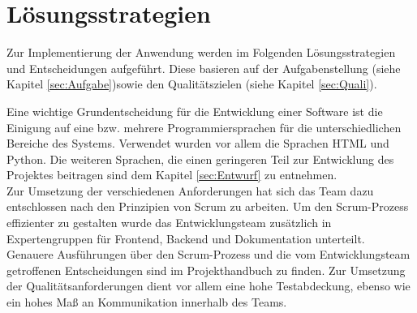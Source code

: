 \chapter{Lösungsstrategien}
Zur Implementierung der Anwendung werden im Folgenden Lösungsstrategien und Entscheidungen aufgeführt. Diese basieren auf der Aufgabenstellung (siehe Kapitel \ref{sec:Aufgabe})sowie den Qualitätszielen (siehe Kapitel \ref{sec:Quali}).

Eine wichtige Grundentscheidung für die Entwicklung einer Software ist die Einigung auf eine bzw. mehrere Programmiersprachen für die unterschiedlichen Bereiche des Systems. Verwendet wurden vor allem die Sprachen HTML und Python. Die weiteren Sprachen, die einen geringeren Teil zur Entwicklung des Projektes beitragen sind dem Kapitel \ref{sec:Entwurf} zu entnehmen. \\
Zur Umsetzung der verschiedenen Anforderungen hat sich das Team dazu entschlossen nach den Prinzipien von Scrum zu arbeiten. Um den Scrum-Prozess effizienter zu gestalten wurde das Entwicklungsteam zusätzlich in Expertengruppen für \gls{Frontend}, \gls{Backend} und Dokumentation unterteilt. Genauere Ausführungen über den Scrum-Prozess und die vom Entwicklungsteam getroffenen Entscheidungen sind im Projekthandbuch zu finden.
Zur Umsetzung der Qualitätsanforderungen dient vor allem eine hohe Testabdeckung, ebenso wie ein hohes Maß an Kommunikation innerhalb des Teams.